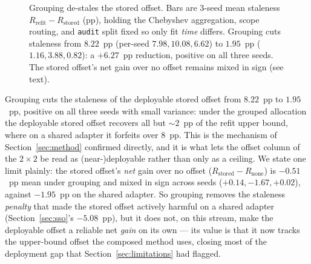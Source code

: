 \begin{figure}[t]
\centering
{}
\caption{Grouping de-stales the stored offset. Bars are 3-seed mean staleness
$R_{\mathrm{refit}}-R_{\mathrm{stored}}$ (pp), holding the Chebyshev aggregation,
scope routing, and \texttt{audit} split fixed so only fit \emph{time} differs.
Grouping cuts staleness from $8.22$~pp (per-seed $7.98,10.08,6.62$) to $1.95$~pp
($1.16,3.88,0.82$): a $+6.27$~pp reduction, positive on all three seeds. The stored
offset's net gain over no offset remains mixed in sign (see text).}
\label{fig:destale}
\end{figure}

\noindent Grouping cuts the staleness of the deployable stored offset from $8.22$~pp to
$1.95$~pp, positive on all three seeds with small variance: under the grouped allocation
the deployable stored offset recovers all but $\sim2$~pp of the refit upper bound, where
on a shared adapter it forfeits over $8$~pp. This is the mechanism of
Section~\ref{sec:method} confirmed directly, and it is what lets the offset column of the
$2\times2$ be read as (near-)deployable rather than only as a ceiling. We state one
limit plainly: the stored offset's \emph{net} gain over no offset ($R_{\mathrm{stored}}-
R_{\mathrm{none}}$) is $-0.51$~pp mean under grouping and mixed in sign across seeds
($+0.14,-1.67,+0.02$), against $-1.95$~pp on the shared adapter. So grouping removes the
staleness \emph{penalty} that made the stored offset actively harmful on a shared adapter
(Section~\ref{sec:sso}'s $-5.08$~pp), but it does not, on this stream, make the deployable
offset a reliable net \emph{gain} on its own --- its value is that it now tracks the
upper-bound offset the composed method uses, closing most of the deployment gap that
Section~\ref{sec:limitations} had flagged.
